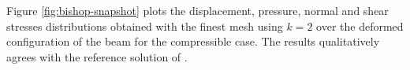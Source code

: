 \documentclass{wccm2024}
\begin{document}
Figure \ref{fig:bishop-snapshot} plots the displacement, pressure, normal and shear stresses distributions obtained with the finest mesh using $k=2$ over the deformed configuration of the beam for the compressible case. The results qualitatively agrees with the reference solution of \cite{bishop2014displacement}.

\begin{figure}
    \centering
     \hfill
     \\
     \hfill

\end{figure}
\end{document}
